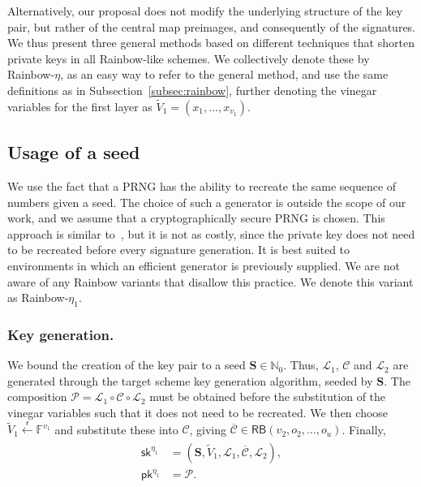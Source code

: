 \documentclass[12pt, a4paper, oneside]{memoir}
\newcommand{\random}{\overset{\mathsf{r}}{\gets}}
\theoremstyle{definition}
\begin{document}
Alternatively, our proposal does not modify the underlying structure of the key pair, but rather of the central map preimages, and consequently of the signatures. We thus present three general methods based on different techniques that shorten private keys in all Rainbow-like schemes. We collectively denote these by Rainbow-$\eta$, as an easy way to refer to the general method, and use the same definitions as in Subsection~\ref{subsec:rainbow}, further denoting the vinegar variables for the first layer as $\widetilde{V}_{1} = (x_{1}, \dots, x_{v_{1}})$.

\subsection{Usage of a seed}

We use the fact that a PRNG has the ability to recreate the same sequence of numbers given a seed. The choice of such a generator is outside the scope of our work, and we assume that a cryptographically secure PRNG is chosen. This approach is similar to~\cite{Shim:201512}, but it is not as costly, since the private key does not need to be recreated before every signature generation. It is best suited to environments in which an efficient generator is previously supplied. We are not aware of any Rainbow variants that disallow this practice. We denote this variant as Rainbow-$\eta_{1}$.

\subsubsection{Key generation.}

We bound the creation of the key pair to a seed $\mathbf{S} \in \mathbb{N}_{0}$. Thus, $\mathcal{L}_{1}$, $\mathcal{C}$ and $\mathcal{L}_{2}$ are generated through the target scheme key generation algorithm, seeded by $\mathbf{S}$. The composition $\mathcal{P} = \mathcal{L}_{1} \circ \mathcal{C} \circ \mathcal{L}_{2}$ must be obtained before the substitution of the vinegar variables such that it does not need to be recreated. We then choose $\widetilde{V}_{1} \random \mathbb{F}^{v_{1}}$ and substitute these into $\mathcal{C}$, giving $\overline{\mathcal{C}} \in \mathsf{RB}(v_{2}, o_{2}, \dots, o_{u})$. Finally,
\begin{align}
  \begin{split}
    \mathsf{sk}^{\eta_{1}} &= (\mathbf{S}, \widetilde{V}_{1}, \mathcal{L}_{1}, \overline{\mathcal{C}}, \mathcal{L}_{2}), \\
    \mathsf{pk}^{\eta_{1}} &= \mathcal{P}.
  \end{split}
\end{align}
\end{document}
